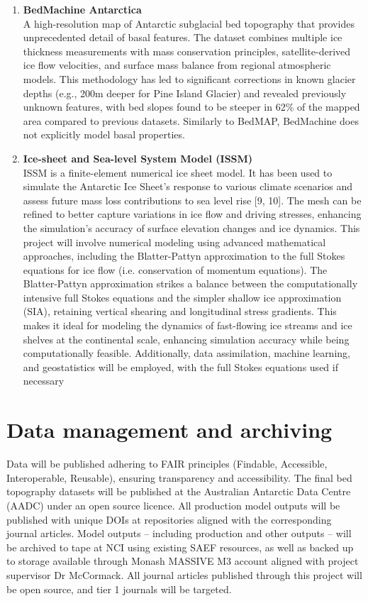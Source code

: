 \begin{enumerate}
    \item\textbf{BedMachine Antarctica}\\
    A high-resolution map of Antarctic subglacial bed topography that provides unprecedented detail of basal features. The dataset combines multiple ice thickness measurements with mass conservation principles, satellite-derived ice flow velocities, and surface mass balance from regional atmospheric models. This methodology has led to significant corrections in known glacier depths (e.g., 200m deeper for Pine Island Glacier) and revealed previously unknown features, with bed slopes found to be steeper in 62\% of the mapped area compared to previous datasets\cite{Morlighem_2020}. Similarly to BedMAP, BedMachine does not explicitly model basal properties.


    \item\textbf{Ice-sheet and Sea-level System Model (ISSM)}\\
    ISSM is a finite-element numerical ice sheet model. It has been used to simulate the Antarctic Ice Sheet’s response to various climate scenarios and assess future mass loss contributions to sea level rise [9, 10]. The mesh can be refined to better capture variations in ice flow and driving stresses, enhancing the simulation’s accuracy of surface elevation changes and ice dynamics. This project will involve numerical modeling using advanced mathematical approaches, including the Blatter-Pattyn approximation to the full Stokes equations for ice flow (i.e. conservation of momentum equations). The Blatter-Pattyn approximation strikes a balance between the computationally intensive full Stokes equations and the simpler shallow ice approximation (SIA), retaining vertical shearing and longitudinal stress gradients. This makes it ideal for modeling the dynamics of fast-flowing ice streams and ice shelves at the continental scale, enhancing simulation accuracy while being computationally feasible. Additionally, data assimilation, machine learning, and geostatistics will be employed, with the full Stokes equations used if necessary~\cite{ISSM}
\end{enumerate}

\section*{Data management and archiving}

Data will be published adhering to FAIR principles (Findable, Accessible, Interoperable, Reusable), ensuring transparency and accessibility. The final bed topography datasets will be published at the Australian Antarctic Data Centre (AADC) under an open source licence. All production model outputs will be published with unique DOIs at repositories aligned with the corresponding journal articles. Model outputs – including production and other outputs – will be archived to tape at NCI using existing SAEF resources, as well as backed up to storage available through Monash MASSIVE M3 account aligned with project supervisor Dr McCormack. All journal articles published through this project will be open source, and tier 1 journals will be targeted.

